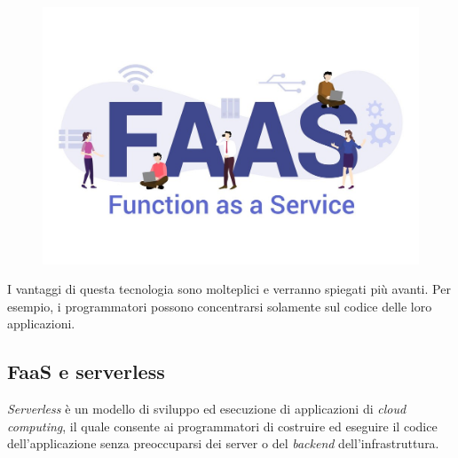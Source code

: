 \documentclass[a4paper]{article}
\begin{document}
	\begin{figure}[!htp]
		\centering
		\includegraphics[width=\textwidth]{img/faas-1.jpg}
	\end{figure}
	
	\noindent
	I vantaggi di questa tecnologia sono molteplici e verranno spiegati più avanti. Per esempio, i programmatori possono concentrarsi solamente sul codice delle loro applicazioni.
	
	\newpage
	
	\subsection{FaaS e serverless}
	
	\emph{Serverless} è un modello di sviluppo ed esecuzione di applicazioni di \emph{cloud computing}, il quale consente ai programmatori di costruire ed eseguire il codice dell'applicazione senza preoccuparsi dei server o del \emph{backend} dell'infrastruttura.
	
\end{document}

